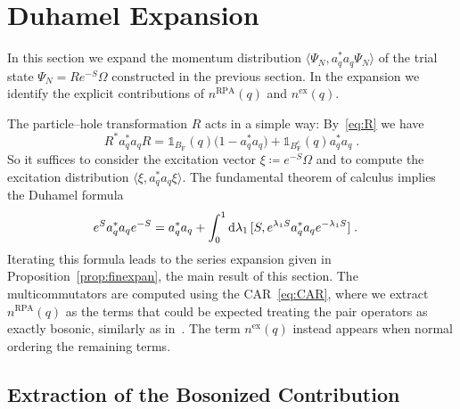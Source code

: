 \documentclass[12pt,a4paper]{article}
\numberwithin{equation}{section}
\newcommand{\1}{\mathbb{I}}
\newcommand{\di}{\textnormal{d}}
\newcommand{\ex}{\mathrm{ex}}
\newcommand{\F}{\mathrm{F}}
\newcommand{\RPA}{\mathrm{RPA}}
\theoremstyle{plain}
\theoremstyle{definition}
\theoremstyle{remark}
\theoremstyle{plain}
\theoremstyle{definition}
\theoremstyle{remark}
\begin{document}
\section{Duhamel Expansion}\label{sec:extraction}

In this section we expand the momentum distribution $ \langle \Psi_N, a_q^* a_q \Psi_N \rangle $ of the trial state $ \Psi_N = R e^{-S} \Omega $ constructed in the previous section. In the expansion we identify the explicit contributions of $ n^{\RPA}(q) $ and $ n^{\ex}(q) $.

The particle--hole transformation $ R $ acts in a simple way: By~\eqref{eq:R} we have
\begin{equation} \label{eq:momentum_dist_R_trafo}
	R^* a_q^* a_q R
	= \mathds{1}_{B_{\F}}(q) \big( 1 - a_q^* a_q  \big)
		+ \mathds{1}_{B_{\F}^c}(q)  a_q^* a_q \;.
\end{equation}
So it suffices to consider the excitation vector $ \xi \coloneq e^{-S} \Omega $ and to compute the excitation distribution $ \langle \xi, a_q^* a_q \xi \rangle $. The fundamental theorem of calculus implies the Duhamel formula
\begin{equation} \label{eq:duhamelexpansion_blueprint}
\begin{aligned}
	e^{S} a_q^* a_q e^{-S}
& = a_q^* a_q
		+ \int_0^1 \di \lambda_1 \,   [S, e^{\lambda_1 S} a_q^* a_q e^{-\lambda_1 S}] \;.
\end{aligned}
\end{equation}
Iterating this formula leads to the series expansion given in Proposition~\ref{prop:finexpan}, the main result of this section. The multicommutators are computed using the CAR~\eqref{eq:CAR}, where we extract $ n^{\RPA}(q) $ as the terms that could be expected treating the pair operators as exactly bosonic, similarly as in~\cite{BL25}. The term $ n^{\ex}(q) $ instead appears when normal ordering the remaining terms.



\subsection{Extraction of the Bosonized Contribution}
\label{sec:extraction_bos}
\end{document}
